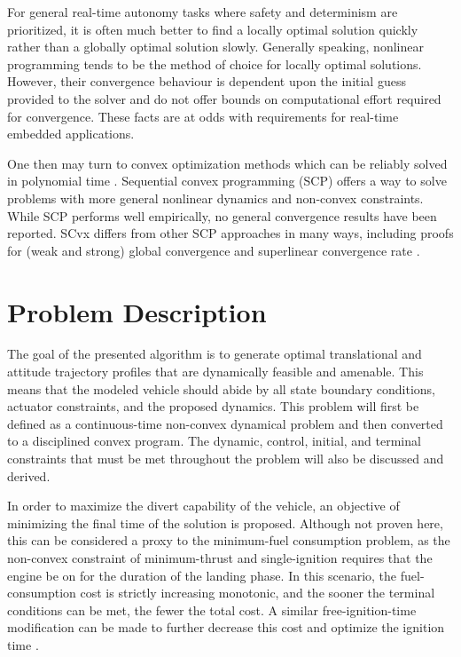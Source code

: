 \documentclass[conf]{new-aiaa}
\begin{document}
For general real-time autonomy tasks where safety and determinism are prioritized, it is often much better to find a locally optimal solution quickly rather than a globally optimal solution slowly. Generally speaking, nonlinear programming tends to be the method of choice for locally optimal solutions. However, their convergence behaviour is dependent upon the initial guess provided to the solver and do not offer bounds on computational effort required for convergence. These facts are at odds with requirements for real-time embedded applications.

One then may turn to convex optimization methods which can be reliably solved in polynomial time \cite{nesterov1994interior}. Sequential convex programming (SCP) offers a way to solve problems with more general nonlinear dynamics and non-convex constraints. While SCP performs well empirically, no general convergence results have been reported. SCvx differs from other SCP approaches in many ways, including proofs for (weak and strong) global convergence and superlinear convergence rate \cite{mao2016successive}.







\section{Problem Description}
The goal of the presented algorithm is to generate optimal translational and attitude trajectory profiles that are dynamically feasible and amenable. This means that the modeled vehicle should abide by all state boundary conditions, actuator constraints, and the proposed dynamics. This problem will first be defined as a continuous-time non-convex dynamical problem and then converted to a disciplined convex program. The dynamic, control, initial, and terminal constraints that must be met throughout the problem will also be discussed and derived.

In order to maximize the divert capability of the vehicle, an objective of minimizing the final time of the solution is proposed. Although not proven here, this can be considered a proxy to the minimum-fuel consumption problem, as the non-convex constraint of minimum-thrust and single-ignition requires that the engine be on for the duration of the landing phase. In this scenario, the fuel-consumption cost is strictly increasing monotonic, and the sooner the terminal conditions can be met, the fewer the total cost. A similar free-ignition-time modification can be made to further decrease this cost and  optimize the ignition time \cite{szmuk2019successive}. 
\end{document}
